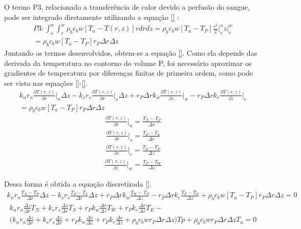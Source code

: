 \documentclass[
	12pt,				%
	openright,			%
	oneside,			%
	a4paper,			%
	english,			%
	french,				%
	spanish,			%
	brazil				%
	]{abntex2}
\begin{document}
O termo P3, relacionado a transferência de calor devido a perfusão do sangue, pode ser integrado diretamente utilizando a equação \ref{} :
\begin{gather}                                           
P3:\int_{s}^{n} \int_{e}^{w} \rho_b c_b w [T_a-T(r,z)]rdrdz = \rho_b c_b w [T_a-T_P]\frac{r^2}{2}\biggr\rvert^{n}_{s}z\biggr\rvert^{w}_{e}\\ =\rho_b c_b w [T_a-T_P]r_P \Delta r\Delta z
\end{gather} 
Juntando os termos desenvolvidos, obtem-se a equação \ref{}. Como ela depende das derivada da temperatura no contorno do volume P, foi necessário aproximar os  gradientes de temperatura por diferenças finitas de primeira ordem, como pode ser visto nas equações \ref{}-\ref{}.
\begin{gather}
\label{eqn:semi_discre}
k_n r_n \frac{\partial T(r,z)}{\partial r}\biggr\rvert_{n}\Delta z-k_s r_s \frac{\partial T(r,z)}{\partial r}\biggr\rvert_{s}\Delta z
+
r_P \Delta r k_w \frac{\partial T(r,z)}{\partial z} \biggr\rvert_{w} -r_P \Delta r k_e \frac{\partial T(r,z)}{\partial z} \biggr\rvert_{e}
\\
=\rho_b c_b w [T_a-T_P]r_P \Delta r\Delta z
\end{gather}
\begin{gather}
\label{eqn:aprox_norte}
\frac{\partial T(r,z)}{\partial r}\biggr|_{n}=\frac{T_N-T_P}{\Delta r}
\end{gather}
\begin{gather}
\label{eqn:aprox_sul}
\frac{\partial T(r,z)}{\partial r}\biggr|_{s}=\frac{T_P-T_S}{\Delta r}
\end{gather}
\begin{gather}
\label{eqn:aprox_leste}
\frac{\partial T(r,z)}{\partial z}\biggr|_{e}=\frac{T_E-T_P}{\Delta z}
\end{gather}
\begin{gather}
\label{eqn:aprox_oeste}
\frac{\partial T(r,z)}{\partial z}\biggr|_{w}=\frac{T_P-T_W}{\Delta z}
\end{gather}

Dessa forma é obtida a equação discretizada \ref{}.
\begin{gather}                                           
k_n r_n \frac{T_N-T_P}{\Delta r}\Delta z -
k_s r_s  \frac{T_P-T_S}{\Delta r}\Delta z +
r_P \Delta r k_w \frac{T_W-T_P}{\Delta z} -
r_P \Delta r k_e \frac{T_P-T_E}{\Delta z}+
\rho_b c_b w [T_a-T_P]r_P \Delta r\Delta z = 0
\end{gather}
\begin{gather}
k_n r_n \frac{\Delta z}{\Delta r}T_N +
k_s r_s \frac{\Delta z}{\Delta r}T_S +
r_P k_w \frac{\Delta r}{\Delta z}T_W +
r_P k_e \frac{\Delta r}{\Delta z}T_E -
\\
\biggr( 
k_n r_n \frac{\Delta z}{\Delta r} +
k_s r_s \frac{\Delta z}{\Delta r} +
r_P k_w \frac{\Delta r}{\Delta z} +
r_P k_e \frac{\Delta r}{\Delta z} + 
\rho_b c_b wr_P \Delta r\Delta z
\biggr)Tp +
\rho_b c_b wr_P \Delta r\Delta z T_a = 
0
\end{gather}
\end{document}

